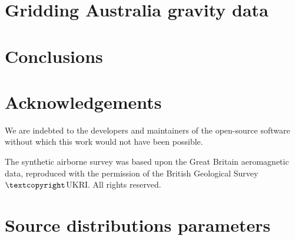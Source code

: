 \documentclass[twocolumn]{article}
\begin{document}

\section{Gridding Australia gravity data}


\section{Conclusions}


\section{Acknowledgements}

We are indebted to the developers and maintainers of the open-source software
without which this work would not have been possible.

The synthetic airborne survey was based upon the Great Britain aeromagnetic
data, reproduced with the permission of the British Geological Survey
$\textcopyright$UKRI\@.
All rights reserved.


\appendix

\section{Source distributions parameters}
\end{document}
